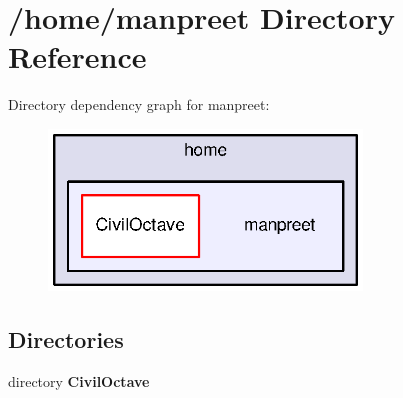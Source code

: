 \section{/home/manpreet Directory Reference}
\label{dir_80ce69022714ba081a565637232ed319}
Directory dependency graph for manpreet\-:
\nopagebreak
\begin{figure}[H]
\begin{center}
\leavevmode
\includegraphics[width=236pt]{dir_80ce69022714ba081a565637232ed319_dep}
\end{center}
\end{figure}
\subsection*{Directories}
\begin{DoxyCompactItemize}
\item 
directory {\bf Civil\-Octave}
\end{DoxyCompactItemize}
